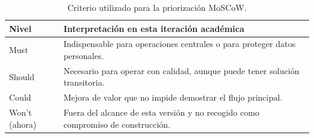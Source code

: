 \begin{table}[H]\centering\small
\caption{Criterio utilizado para la priorización MoSCoW.}\label{tab:moscow}
\begin{tabularx}{\linewidth}{@{}p{2.5cm}X@{}}\toprule
\textbf{Nivel} & \textbf{Interpretación en esta iteración académica}\\\midrule
Must & Indispensable para operaciones centrales o para proteger datos personales.\\
Should & Necesario para operar con calidad, aunque puede tener solución transitoria.\\
Could & Mejora de valor que no impide demostrar el flujo principal.\\
Won't (ahora) & Fuera del alcance de esta versión y no recogido como compromiso de construcción.\\\bottomrule
\end{tabularx}
\end{table}

